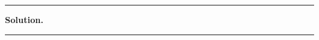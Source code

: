 \documentclass{exam}
\begin{document}
\begin{questions}
\vspace{2mm}\hrule\vspace{2mm} 

\textbf{Solution.} \\[0.5mm]  






\vspace{2mm}\hrule\vspace{2mm}


 
\end{questions}
\end{document}
